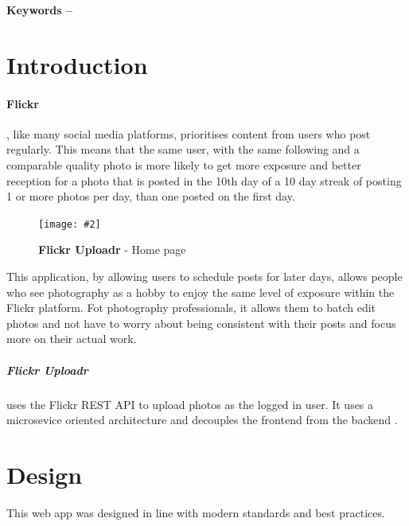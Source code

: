 \documentclass[10pt, a4paper]{article}
\title{\mytitle}
\author{\myauthor\hspace{1em}\\\contact\\Edinburgh Napier University\hspace{0.5em}-\hspace{0.5em}\mymodule}
\date{}
\newcommand{\figuremacro}[5]{
\begin{figure}[#1]
\centering
\texttt{[image: \#2]}
\caption[#3]{\textbf{#3}#4}
\label{fig:#2}
\end{figure}
}
\begin{document}
\maketitle
\begin{abstract}
        Flickr Uploadr is an application that allows users of the photography oriented platform Flickr to schedule photos to be uploaded at a later date. The users conenct their flickr account to the app and can schedule photos to be uploaded and can change the title, description and tags of a photo.
        \end{abstract}

        \textbf{Keywords -- }{\mykeywords}

        \section{Introduction}
        \paragraph{Flickr}, like many social media platforms, prioritises content from users who post regularly. This means that the same user, with the same following and a comparable quality photo is more likely to get more exposure and better reception for a photo that is posted in the 10th day of a 10 day streak of posting 1 or more photos per day, than one posted on the first day.

        \figuremacro{h}{home}{Flickr Uploadr}{ - Home page}{1.0}

        This application, by allowing users to schedule posts for later days, allows people who see photography as a hobby to enjoy the same level of exposure within the Flickr platform. Fot photography professionals, it allows them to batch edit photos and not have to worry about being consistent with their posts and focus more on their actual work.

        \subparagraph{Flickr Uploadr} uses the Flickr REST API \cite{Flickr_Services} to upload photos as the logged in user.
        It uses a microsevice oriented architecture and decouples the frontend from the backend \cite{Microservices_and_SPAs_2017}.

        \section{Design}
        This web app was designed in line with modern standards and best practices.
\end{document}
